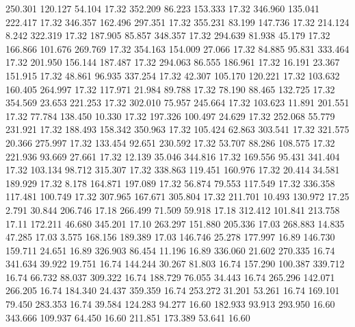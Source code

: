  250.301  120.127   54.104        17.32
 352.209   86.223  153.333        17.32
 346.960  135.041  222.417        17.32
 346.357  162.496  297.351        17.32
 355.231   83.199  147.736        17.32
 214.124    8.242  322.319        17.32
 187.905   85.857  348.357        17.32
 294.639   81.938   45.179        17.32
 166.866  101.676  269.769        17.32
 354.163  154.009   27.066        17.32
  84.885   95.831  333.464        17.32
 201.950  156.144  187.487        17.32
 294.063   86.555  186.961        17.32
  16.191   23.367  151.915        17.32
  48.861   96.935  337.254        17.32
  42.307  105.170  120.221        17.32
 103.632  160.405  264.997        17.32
 117.971   21.984   89.788        17.32
  78.190   88.465  132.725        17.32
 354.569   23.653  221.253        17.32
 302.010   75.957  245.664        17.32
 103.623   11.891  201.551        17.32
  77.784  138.450   10.330        17.32
 197.326  100.497   24.629        17.32
 252.068   55.779  231.921        17.32
 188.493  158.342  350.963        17.32
 105.424   62.863  303.541        17.32
 321.575   20.366  275.997        17.32
 133.454   92.651  230.592        17.32
  53.707   88.286  108.575        17.32
 221.936   93.669   27.661        17.32
  12.139   35.046  344.816        17.32
 169.556   95.431  341.404        17.32
 103.134   98.712  315.307        17.32
 338.863  119.451  160.976        17.32
  20.414   34.581  189.929        17.32
   8.178  164.871  197.089        17.32
  56.874   79.553  117.549        17.32
 336.358  117.481  100.749        17.32
 307.965  167.671  305.804        17.32
 211.701   10.493  130.972        17.25
   2.791   30.844  206.746        17.18
 266.499   71.509   59.918        17.18
 312.412  101.841  213.758        17.11
 172.211   46.680  345.201        17.10
 263.297  151.880  205.336        17.03
 268.883   14.835   47.285        17.03
   3.575  168.156  189.389        17.03
 146.746   25.278  177.997        16.89
 146.730  159.711   24.651        16.89
 326.903   86.454   11.196        16.89
 336.060   21.602  270.335        16.74
 341.634   39.922   19.751        16.74
 144.244   30.267   81.803        16.74
 157.290  100.387  339.712        16.74
  66.732   88.037  309.322        16.74
 188.729   76.055   34.443        16.74
 265.296  142.071  266.205        16.74
 184.340   24.437  359.359        16.74
 253.272   31.201   53.261        16.74
 169.101   79.450  283.353        16.74
  39.584  124.283   94.277        16.60
 182.933   93.913  293.950        16.60
 343.666  109.937   64.450        16.60
 211.851  173.389   53.641        16.60
